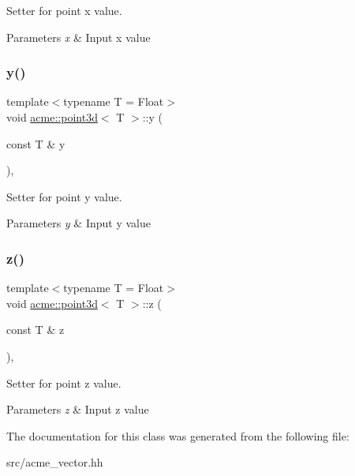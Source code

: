 Setter for point x value. 


\begin{DoxyParams}{Parameters}
{\em x} & Input x value \\
\hline
\end{DoxyParams}
\mbox{\label{classacme_1_1point3d_ad9b058b4ba5ca4172a8c4ded27c89825}} 
\subsubsection{\texorpdfstring{y()}{y()}}
{\footnotesize\ttfamily template$<$typename T = Float$>$ \\
void \hyperlink{classacme_1_1point3d}{acme\+::point3d}$<$ T $>$\+::y (\begin{DoxyParamCaption}\item[{const T \&}]{y }\end{DoxyParamCaption})\hspace{0.3cm}{\ttfamily [inline]}, {\ttfamily [inherited]}}



Setter for point y value. 


\begin{DoxyParams}{Parameters}
{\em y} & Input y value \\
\hline
\end{DoxyParams}
\mbox{\label{classacme_1_1point3d_aad69f4d32ffafffd008214c361fa843f}} 
\subsubsection{\texorpdfstring{z()}{z()}}
{\footnotesize\ttfamily template$<$typename T = Float$>$ \\
void \hyperlink{classacme_1_1point3d}{acme\+::point3d}$<$ T $>$\+::z (\begin{DoxyParamCaption}\item[{const T \&}]{z }\end{DoxyParamCaption})\hspace{0.3cm}{\ttfamily [inline]}, {\ttfamily [inherited]}}



Setter for point z value. 


\begin{DoxyParams}{Parameters}
{\em z} & Input z value \\
\hline
\end{DoxyParams}


The documentation for this class was generated from the following file\+:\begin{DoxyCompactItemize}
\item 
src/acme\+\_\+vector.\+hh\end{DoxyCompactItemize}
